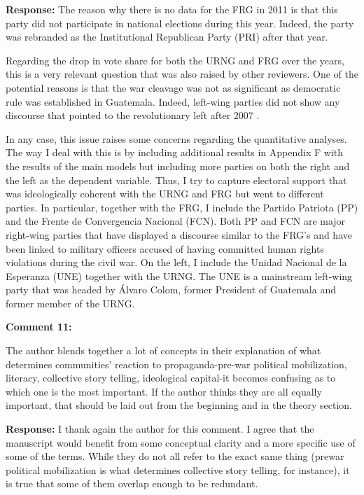 \documentclass[12pt, a4paper, notitlepage]{article}
\begin{document}
\noindent\textbf{Response:} The reason why there is no data for the FRG in 2011 is that this party did not participate in national elections during this year. Indeed, the party was rebranded as the Institutional Republican Party (PRI) after that year.

Regarding the drop in vote share for both the URNG and FRG over the years, this is a very relevant question that was also raised by other reviewers. One of the potential reasons is that the war cleavage was not as significant as democratic rule was established in Guatemala. Indeed, left-wing parties did not show any discourse that pointed to the revolutionary left after 2007 \citep{Ibarra:2008to}.

In any case, this issue raises some concerns regarding the quantitative analyses. The way I deal with this is by including additional results in Appendix F with the results of the main models but including more parties on both the right and the left as the dependent variable. Thus, I try to capture electoral support that was ideologically coherent with the URNG and FRG but went to different parties. In particular, together with the FRG, I include the Partido Patriota (PP) and the Frente de Convergencia Nacional (FCN).
Both PP and FCN are major right-wing parties that have displayed a discourse similar to the FRG's and have been linked to military officers accused of having committed human rights violations during the civil war.
On the left, I include the Unidad Nacional de la Esperanza (UNE) together with the URNG. The UNE is a mainstream left-wing party that was headed by Álvaro Colom, former President of Guatemala and former member of the URNG.

\vspace{15pt}
\noindent\textbf{Comment 11:}
\begin{displayquote}
The author blends together a lot of concepts in their explanation of what determines communities' reaction to propaganda-pre-war political mobilization, literacy, collective story telling, ideological capital-it becomes confusing as to which one is the most important. If the author thinks they are all equally important, that should be laid out from the beginning and in the theory section.
\end{displayquote}

\noindent\textbf{Response:} I thank again the author for this comment. I agree that the manuscript would benefit from some conceptual clarity and a more specific use of some of the terms. While they do not all refer to the exact same thing (prewar political mobilization is what determines collective story telling, for instance), it is true that some of them overlap enough to be redundant.
\end{document}
